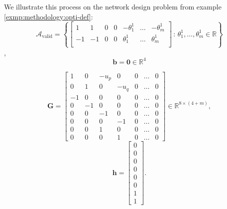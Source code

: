 \begin{exmp}
    We illustrate this process on the network design problem from example \ref{exmp:methodology:opti-def}:
    \begin{equation*}
        \bm{\mathcal{A}}_{\text{valid}} = \left\{
        \begin{bmatrix}
            1 & 1 & 0 & 0 & -\theta^1_1 & \ldots & -\theta^1_m \\
            -1 & -1 & 0 & 0 & \theta^1_1  & \ldots &  \theta^1_m \\
        \end{bmatrix}\,:\,%
        \theta^1_1, \ldots, \theta^1_m \in \mathbb{R}
        \right\}
    \end{equation*},
    \begin{equation*}
        \bm{b} = \bm{0} \in \mathbb{R}^4
    \end{equation*}
    \begin{multicols}{2}
    \noindent
    \begin{equation*}
    \bm{G} = \begin{bmatrix}
        1 & 0 & -u_p & 0 & 0 & \ldots & 0 \\
        0 & 1 & 0 & -u_q & 0 & \ldots & 0 \\
        -1 & 0 & 0 & 0 & 0 & \ldots & 0 \\
        0 & -1 & 0 & 0 & 0 & \ldots & 0 \\
        0 & 0 & -1 & 0 & 0 & \ldots & 0 \\
        0 & 0 & 0 & -1 & 0 & \ldots & 0 \\
        0 & 0 & 1 & 0 & 0 & \ldots & 0 \\
        0 & 0 & 0 & 1 & 0 & \ldots & 0
    \end{bmatrix} \in \mathbb{R}^{8 \times (4 + m)},
    \end{equation*}
    \columnbreak
    \begin{equation*}
        \bm{h} = \begin{bmatrix}
        0 \\0 \\ 0\\ 0\\ 0\\ 0\\ 1\\ 1
    \end{bmatrix}.
    \end{equation*}
    \end{multicols}
\end{exmp}\newpage

